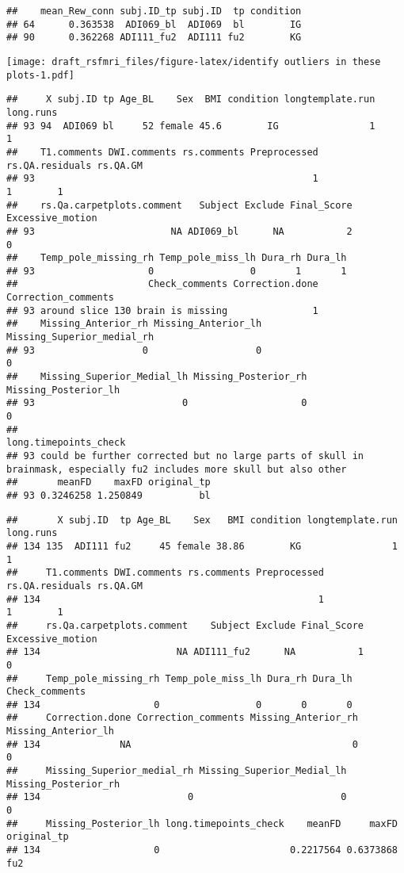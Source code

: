 \documentclass[
]{article}
\begin{document}
\begin{verbatim}
##    mean_Rew_conn subj.ID_tp subj.ID  tp condition
## 64      0.363538  ADI069_bl  ADI069  bl        IG
## 90      0.362268 ADI111_fu2  ADI111 fu2        KG
\end{verbatim}

\texttt{[image: draft\_rsfmri\_files/figure-latex/identify outliers in these plots-1.pdf]}

\begin{verbatim}
##     X subj.ID tp Age_BL    Sex  BMI condition longtemplate.run long.runs
## 93 94  ADI069 bl     52 female 45.6        IG                1         1
##    T1.comments DWI.comments rs.comments Preprocessed rs.QA.residuals rs.QA.GM
## 93                                                 1               1        1
##    rs.Qa.carpetplots.comment   Subject Exclude Final_Score Excessive_motion
## 93                        NA ADI069_bl      NA           2                0
##    Temp_pole_missing_rh Temp_pole_miss_lh Dura_rh Dura_lh
## 93                    0                 0       1       1
##                       Check_comments Correction.done Correction_comments
## 93 around slice 130 brain is missing               1                    
##    Missing_Anterior_rh Missing_Anterior_lh Missing_Superior_medial_rh
## 93                   0                   0                          0
##    Missing_Superior_Medial_lh Missing_Posterior_rh Missing_Posterior_lh
## 93                          0                    0                    0
##                                                                                                     long.timepoints_check
## 93 could be further corrected but no large parts of skull in brainmask, especially fu2 includes more skull but also other
##       meanFD    maxFD original_tp
## 93 0.3246258 1.250849          bl
\end{verbatim}

\begin{verbatim}
##       X subj.ID  tp Age_BL    Sex   BMI condition longtemplate.run long.runs
## 134 135  ADI111 fu2     45 female 38.86        KG                1         1
##     T1.comments DWI.comments rs.comments Preprocessed rs.QA.residuals rs.QA.GM
## 134                                                 1               1        1
##     rs.Qa.carpetplots.comment    Subject Exclude Final_Score Excessive_motion
## 134                        NA ADI111_fu2      NA           1                0
##     Temp_pole_missing_rh Temp_pole_miss_lh Dura_rh Dura_lh Check_comments
## 134                    0                 0       0       0               
##     Correction.done Correction_comments Missing_Anterior_rh Missing_Anterior_lh
## 134              NA                                       0                   0
##     Missing_Superior_medial_rh Missing_Superior_Medial_lh Missing_Posterior_rh
## 134                          0                          0                    0
##     Missing_Posterior_lh long.timepoints_check    meanFD     maxFD original_tp
## 134                    0                       0.2217564 0.6373868         fu2
\end{verbatim}
\end{document}
